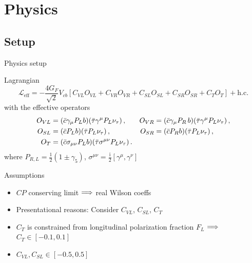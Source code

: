 \section{Physics}
\subsection{Setup}
\begin{frame}{Physics setup}
	\begin{block}{Lagrangian}
	\begin{equation*}\label{eq:Lbc}
	\mathcal{L}_\text{eff} = -\frac{4G_F}{\sqrt{2}}V_{cb}\left[C_{VL}O_{VL}+C_{VR}O_{VR}+C_{SL}O_{SL}+C_{SR}O_{SR}+C_{T}O_{T}\right]+\text{h.c.}
	\end{equation*}
	with the effective operators
	\begin{align*}
	O_{VL}&= (\bar c \gamma_\mu P_L b)(\bar \tau \gamma^\mu P_L \nu_\tau)\,, &  O_{VR}&= (\bar c \gamma_\mu P_R \,b)(\bar \tau \gamma^\mu P_L \nu_\tau)\,,\notag\\
	O_{SL}&= (\bar c P_L b)(\bar \tau  P_L \nu_\tau)\,,& O_{SR}&= (\bar c  P_R b)(\bar \tau  P_L \nu_\tau)\,, \\
	O_{T}&= (\bar c \sigma_{\mu\nu} P_L b)(\bar \tau \sigma^{\mu\nu} P_L \nu_\tau)\,. &\notag
	\end{align*} 
	where $P_{R,L}=\frac{1}{2}(1\pm\gamma_5)$, $\sigma^{\mu\nu}=\frac{\mathrm i}{2}[\gamma^\mu,\gamma^\nu]$
	
	\end{block}
	\begin{block}{Assumptions}
	\begin{itemize}
		\item $CP$ conserving limit $\Longrightarrow$ real Wilson coeffs
		\item Presentational reasons: Consider $C_{VL}$, $C_{SL}$, $C_T$
		\item $C_T$ is constrained from longitudinal polarization fraction $F_L$ $\Longrightarrow$ $C_T\in [-0.1, 0.1]$
		\item $C_{VL}, C_{SL}\in [-0.5, 0.5]$
	\end{itemize}
	\end{block}
\end{frame}

